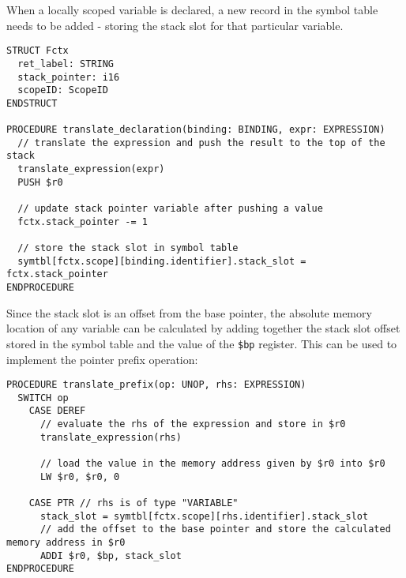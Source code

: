 When a locally scoped variable is declared, a new record in the symbol table needs to be added - storing the stack slot for that particular variable. 

\begin{lstlisting}
STRUCT Fctx
  ret_label: STRING 
  stack_pointer: i16 
  scopeID: ScopeID
ENDSTRUCT

PROCEDURE translate_declaration(binding: BINDING, expr: EXPRESSION) 
  // translate the expression and push the result to the top of the stack
  translate_expression(expr)
  PUSH $r0

  // update stack pointer variable after pushing a value 
  fctx.stack_pointer -= 1 

  // store the stack slot in symbol table
  symtbl[fctx.scope][binding.identifier].stack_slot = fctx.stack_pointer
ENDPROCEDURE
\end{lstlisting}

Since the stack slot is an offset from the base pointer, the absolute memory location of any variable can be calculated by adding together the stack slot offset stored in the symbol table and the value of the \texttt{\$bp} register. This can be used to implement the pointer prefix operation:

\begin{lstlisting}
PROCEDURE translate_prefix(op: UNOP, rhs: EXPRESSION) 
  SWITCH op 
    CASE DEREF 
      // evaluate the rhs of the expression and store in $r0
      translate_expression(rhs)

      // load the value in the memory address given by $r0 into $r0
      LW $r0, $r0, 0

    CASE PTR // rhs is of type "VARIABLE"
      stack_slot = symtbl[fctx.scope][rhs.identifier].stack_slot
      // add the offset to the base pointer and store the calculated memory address in $r0
      ADDI $r0, $bp, stack_slot
ENDPROCEDURE
\end{lstlisting}
